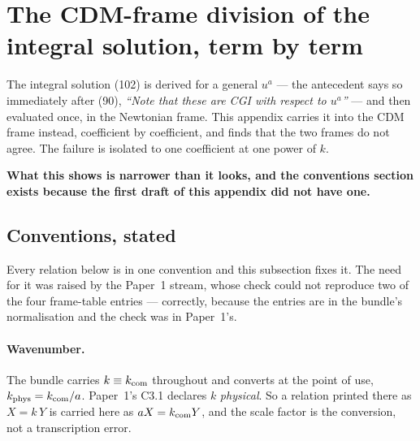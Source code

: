 %
%
\section{The CDM-frame division of the integral solution, term by term}
\label{sec:frame-division}

The integral solution (102) is derived for a general $u^a$ --- the antecedent
says so immediately after (90), \emph{``Note that these are CGI with respect to
$u^a$''} --- and then evaluated once, in the Newtonian frame. This appendix
carries it into the CDM frame instead, coefficient by coefficient, and finds
that the two frames do not agree. The failure is isolated to one coefficient at
one power of $k$.

\textbf{What this shows is narrower than it looks, and the conventions
section exists because the first draft of this appendix did not have one.}

\subsection{Conventions, stated}
\label{sec:frame-division-conventions}

Every relation below is in one convention and this subsection fixes it. The
need for it was raised by the Paper~1 stream, whose check could not reproduce
two of the four frame-table entries --- correctly, because the entries are in
the bundle's normalisation and the check was in Paper~1's.

\paragraph{Wavenumber.} The bundle carries $k\equiv k_{\rm com}$ throughout and
converts at the point of use, $k_{\rm phys}=k_{\rm com}/a$. Paper~1's C3.1
declares $k$ \emph{physical}. So a relation printed there as $X=k\,Y$ is
carried here as $aX=k_{\rm com}Y$, and the scale factor is the conversion, not
a transcription error.

